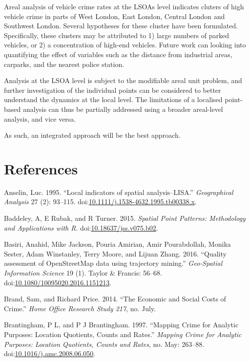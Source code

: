\documentclass[]{article}
\theoremstyle{definition}
\theoremstyle{definition}
\theoremstyle{definition}
\theoremstyle{remark}
\begin{document}
Areal analysis of vehicle crime rates at the LSOAs level indicates
cluters of high vehicle crime in parts of West London, East London,
Central London and Southwest London. Several hypotheses for these
cluster have been formulated. Specifically, these clusters may be
attributed to 1) large numbers of parked vehicles, or 2) a concentration
of high-end vehicles. Future work can looking into quantifying the
effect of variables such as the distance from industrial areas,
carparks, and the nearest police station.

Analysis at the LSOA level is subject to the modifiable areal unit
problem, and further investigation of the individual points can be
considered to better understand the dynamics at the local level. The
limitations of a localised point-based analysis can thus be partially
addressed using a broader areal-level analysis, and vice versa.

As such, an integrated approach will be the best approach.

\pagebreak

\section{References}\label{references}

\hypertarget{refs}{}
\hypertarget{ref-Anselin1995}{}
Anselin, Luc. 1995. ``Local indicators of spatial analysis--LISA.''
\emph{Geographical Analysis} 27 (2): 93--115.
doi:\href{https://doi.org/10.1111/j.1538-4632.1995.tb00338.x}{10.1111/j.1538-4632.1995.tb00338.x}.

\hypertarget{ref-Baddeley2016}{}
Baddeley, A, E Rubak, and R Turner. 2015. \emph{Spatial Point Patterns:
Methodology and Applications with R}.
doi:\href{https://doi.org/10.18637/jss.v075.b02}{10.18637/jss.v075.b02}.

\hypertarget{ref-Basiri2016}{}
Basiri, Anahid, Mike Jackson, Pouria Amirian, Amir Pourabdollah, Monika
Sester, Adam Winstanley, Terry Moore, and Lijuan Zhang. 2016. ``Quality
assessment of OpenStreetMap data using trajectory mining.''
\emph{Geo-Spatial Information Science} 19 (1). Taylor \& Francis:
56--68.
doi:\href{https://doi.org/10.1080/10095020.2016.1151213}{10.1080/10095020.2016.1151213}.

\hypertarget{ref-Brand2014}{}
Brand, Sam, and Richard Price. 2014. ``The Economic and Social Costs of
Crime.'' \emph{Home Office Research Study 217}, no. July.

\hypertarget{ref-Brantingham1997}{}
Brantingham, P L, and P J Brantingham. 1997. ``Mapping Crime for
Analytic Purposes: Location Quotients, Counts and Rates.'' \emph{Mapping
Crime for Analytic Purposes: Location Quotients, Counts and Rates}, no.
May: 263--88.
doi:\href{https://doi.org/10.1016/j.amc.2008.06.050}{10.1016/j.amc.2008.06.050}.
\end{document}
